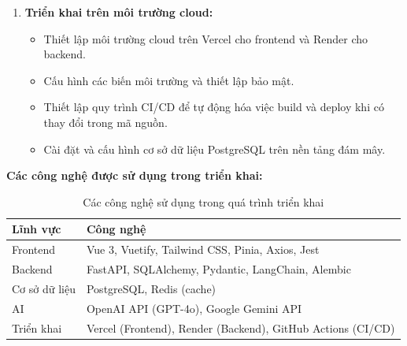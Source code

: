 \begin{enumerate}
\item \textbf{Triển khai trên môi trường cloud:}
\begin{itemize}
    \item Thiết lập môi trường cloud trên Vercel cho frontend và Render cho backend.
    \item Cấu hình các biến môi trường và thiết lập bảo mật.
    \item Thiết lập quy trình CI/CD để tự động hóa việc build và deploy khi có thay đổi trong mã nguồn.
    \item Cài đặt và cấu hình cơ sở dữ liệu PostgreSQL trên nền tảng đám mây.
\end{itemize}

\end{enumerate}
\textbf{Các công nghệ được sử dụng trong triển khai:}
\begin{table}[H]
\centering
\begin{tabularx}{\textwidth}{|l|X|}
\hline
\textbf{Lĩnh vực} & \textbf{Công nghệ} \\ \hline
Frontend & Vue 3, Vuetify, Tailwind CSS, Pinia, Axios, Jest \\ \hline
Backend & FastAPI, SQLAlchemy, Pydantic, LangChain, Alembic \\ \hline
Cơ sở dữ liệu & PostgreSQL, Redis (cache) \\ \hline
AI & OpenAI API (GPT-4o), Google Gemini API \\ \hline
Triển khai & Vercel (Frontend), Render (Backend), GitHub Actions (CI/CD) \\ \hline
\end{tabularx}
\caption{Các công nghệ sử dụng trong quá trình triển khai}
\label{table}
\end{table}
